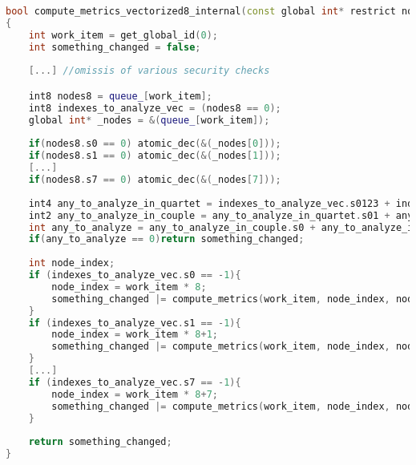 \begin{lstlisting}[language=C++, caption={compute\_metrics\_vectorized8 kernel internal function},captionpos=b]
bool compute_metrics_vectorized8_internal(const global int* restrict nodes, global int8* restrict queue_, const global edge_t* restrict edges, const global edge_t* restrict edges_reverse, const global edge_t* restrict edges_weights, global int3* metriche, const int max_adj_dept, const int max_adj_reverse_dept, const int n_nodes)
{
	int work_item = get_global_id(0);
	int something_changed = false;
	
	[...] //omissis of various security checks

	int8 nodes8 = queue_[work_item];
	int8 indexes_to_analyze_vec = (nodes8 == 0);
	global int* _nodes = &(queue_[work_item]);
	
	if(nodes8.s0 == 0) atomic_dec(&(_nodes[0]));
	if(nodes8.s1 == 0) atomic_dec(&(_nodes[1]));
	[...]
	if(nodes8.s7 == 0) atomic_dec(&(_nodes[7]));
	
	int4 any_to_analyze_in_quartet = indexes_to_analyze_vec.s0123 + indexes_to_analyze_vec.s4567;
	int2 any_to_analyze_in_couple = any_to_analyze_in_quartet.s01 + any_to_analyze_in_quartet.s23;
	int any_to_analyze = any_to_analyze_in_couple.s0 + any_to_analyze_in_couple.s1;
	if(any_to_analyze == 0)return something_changed;
	
	int node_index;
	if (indexes_to_analyze_vec.s0 == -1){
		node_index = work_item * 8;
		something_changed |= compute_metrics(work_item, node_index, nodes, queue_, n_nodes, edges, edges_reverse, edges_weights, metriche, max_adj_dept, max_adj_reverse_dept);
	}
	if (indexes_to_analyze_vec.s1 == -1){
		node_index = work_item * 8+1;
		something_changed |= compute_metrics(work_item, node_index, nodes, queue_, n_nodes, edges, edges_reverse, edges_weights, metriche, max_adj_dept, max_adj_reverse_dept);
	}
	[...]
	if (indexes_to_analyze_vec.s7 == -1){
		node_index = work_item * 8+7;
		something_changed |= compute_metrics(work_item, node_index, nodes, queue_, n_nodes, edges, edges_reverse, edges_weights, metriche, max_adj_dept, max_adj_reverse_dept);
	}
	
	return something_changed;
}
\end{lstlisting}
\newpage
